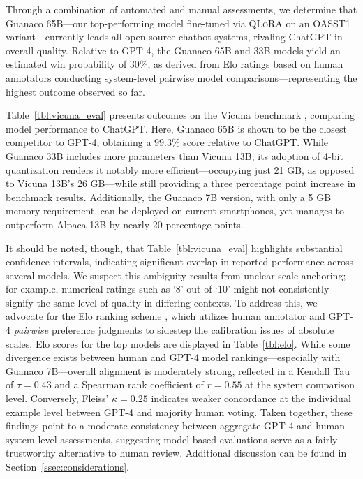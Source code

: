 Through a combination of automated and manual assessments, we determine that {Guanaco} 65B—our top-performing model fine-tuned via \textsc{QLoRA} on an OASST1 variant—currently leads all open-source chatbot systems, rivaling ChatGPT in overall quality. Relative to GPT-4, the {Guanaco} 65B and 33B models yield an estimated win probability of 30\%, as derived from Elo ratings based on human annotators conducting system-level pairwise model comparisons—representing the highest outcome observed so far.

Table~\ref{tbl:vicuna_eval} presents outcomes on the Vicuna benchmark \cite{vicuna2023}, comparing model performance to ChatGPT. Here, {Guanaco} 65B is shown to be the closest competitor to GPT-4, obtaining a 99.3\% score relative to ChatGPT. While {Guanaco} 33B includes more parameters than Vicuna 13B, its adoption of 4-bit quantization renders it notably more efficient—occupying just 21 GB, as opposed to Vicuna 13B's 26 GB—while still providing a three percentage point increase in benchmark results. Additionally, the {Guanaco} 7B version, with only a 5 GB memory requirement, can be deployed on current smartphones, yet manages to outperform Alpaca 13B by nearly 20 percentage points.

It should be noted, though, that Table~\ref{tbl:vicuna_eval} highlights substantial confidence intervals, indicating significant overlap in reported performance across several models. We suspect this ambiguity results from unclear scale anchoring; for example, numerical ratings such as ‘8’ out of ‘10’ might not consistently signify the same level of quality in differing contexts. To address this, we advocate for the Elo ranking scheme \citep{elo1967proposed}, which utilizes human annotator and GPT-4 \textit{pairwise} preference judgments to sidestep the calibration issues of absolute scales. Elo scores for the top models are displayed in Table~\ref{tbl:elo}. While some divergence exists between human and GPT-4 model rankings—especially with Guanaco 7B—overall alignment is moderately strong, reflected in a Kendall Tau of $\tau=0.43$ and a Spearman rank coefficient of $r=0.55$ at the system comparison level. Conversely, Fleiss’ $\kappa=0.25$ indicates weaker concordance at the individual example level between GPT-4 and majority human voting. Taken together, these findings point to a moderate consistency between aggregate GPT-4 and human system-level assessments, suggesting model-based evaluations serve as a fairly trustworthy alternative to human review. Additional discussion can be found in Section~\ref{ssec:considerations}.

